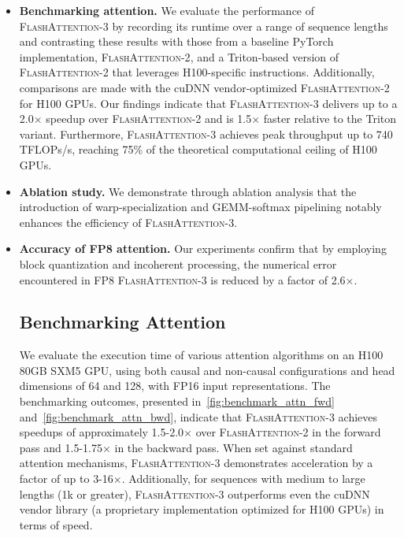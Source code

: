 \begin{itemize}

\item \textbf{Benchmarking attention.} We evaluate the performance of \textsc{FlashAttention-3} by recording its runtime over a range of sequence lengths and contrasting these results with those from a baseline PyTorch implementation, \textsc{FlashAttention-2}, and a Triton-based version of \textsc{FlashAttention-2} that leverages H100-specific instructions. Additionally, comparisons are made with the cuDNN vendor-optimized \textsc{FlashAttention-2} for H100 GPUs. Our findings indicate that \textsc{FlashAttention-3} delivers up to a 2.0$\times$ speedup over \textsc{FlashAttention-2} and is 1.5$\times$ faster relative to the Triton variant. Furthermore, \textsc{FlashAttention-3} achieves peak throughput up to 740 TFLOPs/s, reaching 75\% of the theoretical computational ceiling of H100 GPUs.

\item \textbf{Ablation study.} We demonstrate through ablation analysis that the introduction of warp-specialization and GEMM-softmax pipelining notably enhances the efficiency of \textsc{FlashAttention-3}.

\item \textbf{Accuracy of FP8 attention.} Our experiments confirm that by employing block quantization and incoherent processing, the numerical error encountered in FP8 \textsc{FlashAttention-3} is reduced by a factor of 2.6$\times$.

\subsection{Benchmarking Attention}
\label{subsec:benchmark_attn}

We evaluate the execution time of various attention algorithms on an H100 80GB SXM5 GPU, using both causal and non-causal configurations and head dimensions of 64 and 128, with FP16 input representations. The benchmarking outcomes, presented in~\cref{fig:benchmark_attn_fwd} and~\cref{fig:benchmark_attn_bwd}, indicate that \textsc{FlashAttention-3} achieves speedups of approximately 1.5-2.0$\times$ over \textsc{FlashAttention-2} in the forward pass and 1.5-1.75$\times$ in the backward pass. When set against standard attention mechanisms, \textsc{FlashAttention-3} demonstrates acceleration by a factor of up to 3-16$\times$. Additionally, for sequences with medium to large lengths (1k or greater), \textsc{FlashAttention-3} outperforms even the cuDNN vendor library (a proprietary implementation optimized for H100 GPUs) in terms of speed.


\end{itemize}
